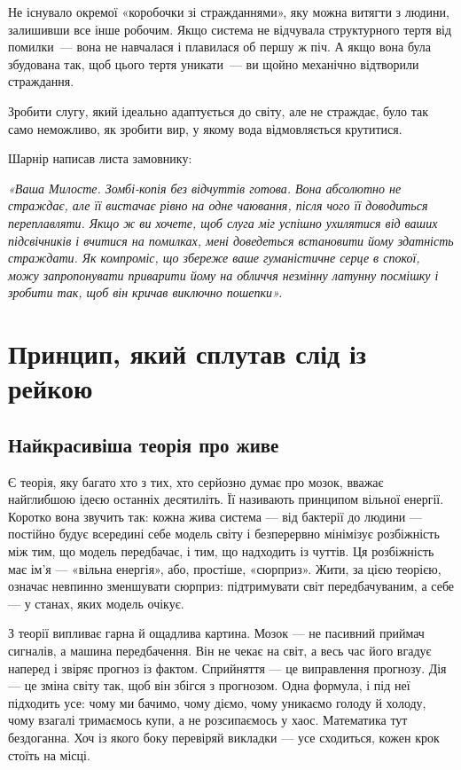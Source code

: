 \documentclass[12pt, a4paper, openany]{book}
\begin{document}
\begin{terrybox}
Не існувало окремої «коробочки зі стражданнями», яку можна витягти з людини, залишивши все інше робочим. Якщо система не відчувала структурного тертя від помилки~--- вона не навчалася і плавилася об першу ж піч. А якщо вона була збудована так, щоб цього тертя уникати~--- ви щойно механічно відтворили страждання.

Зробити слугу, який ідеально адаптується до світу, але не страждає, було так само неможливо, як зробити вир, у якому вода відмовляється крутитися.

\medskip
Шарнір написав листа замовнику:

\medskip
\textit{«Ваша Милосте. Зомбі-копія без відчуттів готова. Вона абсолютно не страждає, але її вистачає рівно на одне чаювання, після чого її доводиться переплавляти. Якщо ж ви хочете, щоб слуга міг успішно ухилятися від ваших підсвічників і вчитися на помилках, мені доведеться встановити йому здатність страждати. Як компроміс, що збереже ваше гуманістичне серце в спокої, можу запропонувати приварити йому на обличчя незмінну латунну посмішку і зробити так, щоб він кричав виключно пошепки».}
\end{terrybox}

\chapter{Принцип, який сплутав слід із рейкою}

\section{Найкрасивіша теорія про живе}

Є теорія, яку багато хто з тих, хто серйозно думає про мозок, вважає найглибшою ідеєю останніх десятиліть. Її називають принципом вільної енергії. Коротко вона звучить так: кожна жива система --- від бактерії до людини --- постійно будує всередині себе модель світу і безперервно мінімізує розбіжність між тим, що модель передбачає, і тим, що надходить із чуттів. Ця розбіжність має ім'я --- «вільна енергія», або, простіше, «сюрприз». Жити, за цією теорією, означає невпинно зменшувати сюрприз: підтримувати світ передбачуваним, а себе --- у станах, яких модель очікує.

З теорії випливає гарна й ощадлива картина. Мозок --- не пасивний приймач сигналів, а машина передбачення. Він не чекає на світ, а весь час його вгадує наперед і звіряє прогноз із фактом. Сприйняття --- це виправлення прогнозу. Дія --- це зміна світу так, щоб він збігся з прогнозом. Одна формула, і під неї підходить усе: чому ми бачимо, чому діємо, чому уникаємо голоду й холоду, чому взагалі тримаємось купи, а не розсипаємось у хаос. Математика тут бездоганна. Хоч із якого боку перевіряй викладки --- усе сходиться, кожен крок стоїть на місці.
\end{document}
